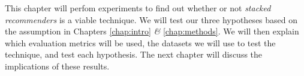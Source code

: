 \label{chap:results}

This chapter will perfom experiments to find out whether or not
\emph{stacked recommenders} is a viable technique.
We will test our three hypotheses based on the assumption in Chapters 
\ref{chap:intro} \emph{\&} \ref{chap:methods}.
We will then explain which evaluation metrics will be used,
the datasets we will use to test the technique,
and test each hypothesis.
The next chapter will discuss the implications of these results.







%

